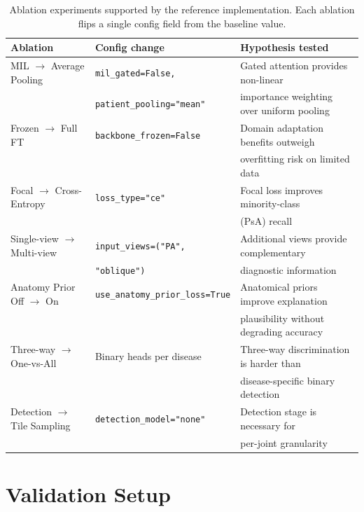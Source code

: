 \documentclass{article}
\begin{document}
\begin{table}[h]
\centering
\caption{Ablation experiments supported by the reference implementation. Each ablation flips a single config field from the baseline value.}
\label{tab:ablations}
\begin{tabular}{@{}lll@{}}
\toprule
\textbf{Ablation} & \textbf{Config change} & \textbf{Hypothesis tested} \\
\midrule
MIL $\rightarrow$ Average Pooling & \texttt{mil\_gated=False,} & Gated attention provides non-linear \\
 & \texttt{patient\_pooling="mean"} & importance weighting over uniform pooling \\
\midrule
Frozen $\rightarrow$ Full FT & \texttt{backbone\_frozen=False} & Domain adaptation benefits outweigh \\
 &  & overfitting risk on limited data \\
\midrule
Focal $\rightarrow$ Cross-Entropy & \texttt{loss\_type="ce"} & Focal loss improves minority-class \\
 &  & (PsA) recall \\
\midrule
Single-view $\rightarrow$ Multi-view & \texttt{input\_views=("PA",} & Additional views provide complementary \\
 & \texttt{"oblique")} & diagnostic information \\
\midrule
Anatomy Prior Off $\rightarrow$ On & \texttt{use\_anatomy\_prior\_loss=True} & Anatomical priors improve explanation \\
 &  & plausibility without degrading accuracy \\
\midrule
Three-way $\rightarrow$ One-vs-All & Binary heads per disease & Three-way discrimination is harder than \\
 &  & disease-specific binary detection \\
\midrule
Detection $\rightarrow$ Tile Sampling & \texttt{detection\_model="none"} & Detection stage is necessary for \\
 &  & per-joint granularity \\
\bottomrule
\end{tabular}
\end{table}

\section{Validation Setup}
\label{sec:setup}
\end{document}
